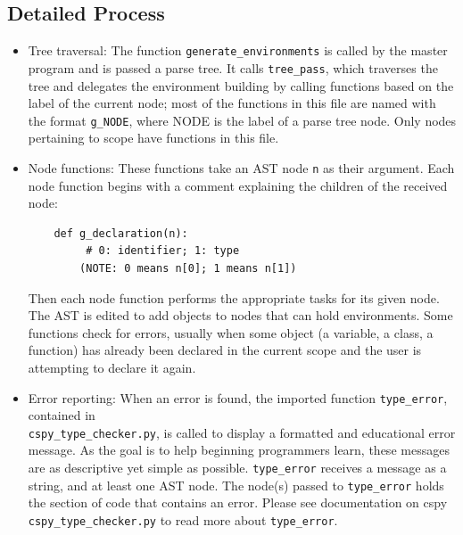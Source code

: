 \documentclass{article}
\begin{document}
\subsection{Detailed Process}
\begin{itemize}
\item Tree traversal: The function \verb|generate_environments| is called by the master program and is passed a parse tree. It calls \verb|tree_pass|, which traverses the tree and delegates the environment building by calling functions based on the label of the current node; most of the functions in this file are named with the format \verb|g_NODE|, where NODE is the label of a parse tree node. Only nodes pertaining to scope have functions in this file.
\item Node functions: These functions take an AST node \verb|n| as their argument. Each node function begins with a comment explaining the children of the received node:
\begin{verbatim}
    def g_declaration(n):
         # 0: identifier; 1: type
        (NOTE: 0 means n[0]; 1 means n[1])
\end{verbatim}
Then each node function performs the appropriate tasks for its given node. The AST is edited to add objects to nodes that can hold environments. Some functions check for errors, usually when some object (a variable, a class, a function) has already been declared in the current scope and the user is attempting to declare it again.
\item Error reporting: When an error is found, the imported function \verb|type_error|, contained in\\ %
\verb|cspy_type_checker.py|, is called to display a formatted and educational error message. As the goal is to help beginning programmers learn, these messages are as descriptive yet simple as possible. \verb|type_error| receives a message as a string, and at least one AST node. The node(s) passed to \verb|type_error| holds the section of code that contains an error. Please see documentation on cspy \verb|cspy_type_checker.py| to read more about \verb|type_error|.
\end{itemize}
\pagebreak
\end{document}
